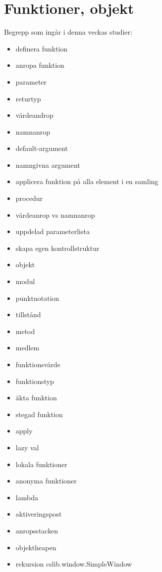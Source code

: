 \chapter{Funktioner, objekt}\label{chapter:W03}
Begrepp som ingår i denna veckas studier:
\begin{multicols}{2}\begin{itemize}[noitemsep,label={$\square$},leftmargin=*]
\item definera funktion
\item anropa funktion
\item parameter
\item returtyp
\item värdeandrop
\item namnanrop
\item default-argument
\item namngivna argument
\item applicera funktion på alla element i en samling
\item procedur
\item värdeanrop vs namnanrop
\item uppdelad parameterlista
\item skapa egen kontrollstruktur
\item objekt
\item modul
\item punktnotation
\item tillstånd
\item metod
\item medlem
\item funktionsvärde
\item funktionstyp
\item äkta funktion
\item stegad funktion
\item apply
\item lazy val
\item lokala funktioner
\item anonyma funktioner
\item lambda
\item aktiveringspost
\item anropsstacken
\item objektheapen
\item rekursion  cslib.window.SimpleWindow\end{itemize}\end{multicols}
